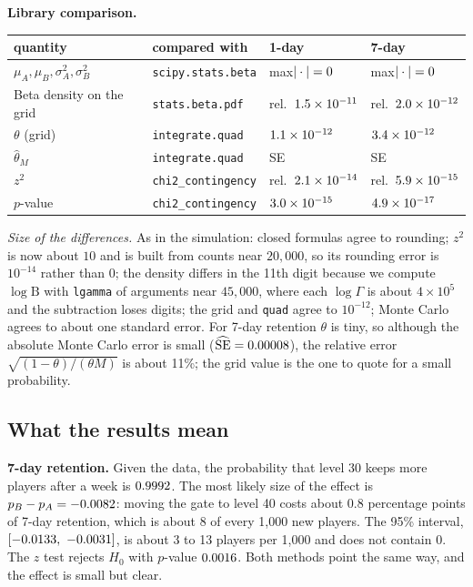 \documentclass[11pt]{article}
\theoremstyle{definition}
\theoremstyle{remark}
\newcommand{\Bfun}{\mathrm{B}}
\begin{document}
\par\noindent\begin{minipage}{\textwidth}\textbf{Library comparison.}
\begin{center}\small
\begin{tabular}{llll}\toprule
quantity & compared with & 1-day & 7-day\\ \midrule
$\mu_A,\mu_B,\sigma_A^2,\sigma_B^2$ & \texttt{scipy.stats.beta} & max$|\cdot|=0$ & max$|\cdot|=0$\\
Beta density on the grid & \texttt{stats.beta.pdf} & rel.\ $1.5\times10^{-11}$ & rel.\ $2.0\times10^{-12}$\\
$\theta$ (grid) & \texttt{integrate.quad} & $1.1\times10^{-12}$ & $3.4\times10^{-12}$\\
$\hat\theta_M$ & \texttt{integrate.quad} & \realOneNSE{} SE & \realSevenNSE{} SE\\
$z^2$ & \texttt{chi2\_contingency} & rel.\ $2.1\times10^{-14}$ & rel.\ $5.9\times10^{-15}$\\
$p$-value & \texttt{chi2\_contingency} & $3.0\times10^{-15}$ & $4.9\times10^{-17}$\\
\bottomrule\end{tabular}\normalsize
\end{center}\end{minipage}

\emph{Size of the differences.} As in the simulation: closed formulas agree to rounding; $z^2$ is now about $10$ and
is built from counts near $20{,}000$, so its rounding error is $10^{-14}$ rather than $0$; the density differs in the
11th digit because we compute $\log\Bfun$ with \texttt{lgamma} of arguments near $45{,}000$, where each
$\log\Gamma$ is about $4\times10^5$ and the subtraction loses digits; the grid and \texttt{quad} agree to $10^{-12}$;
Monte Carlo agrees to about one standard error. For 7-day retention $\theta$ is tiny, so although the absolute
Monte Carlo error is small ($\widehat{\mathrm{SE}}=0.00008$), the relative error
$\sqrt{(1-\theta)/(\theta M)}$ is about 11\%; the grid value is the one to quote for a small probability.

\subsection{What the results mean}\label{sec:meaning}

\textbf{7-day retention.} Given the data, the probability that level 30 keeps more players after a week is
$0.9992$. The most likely size of the effect is $p_B-p_A=-0.0082$: moving the gate to level 40 costs
about $0.8$ percentage points of 7-day retention, which is about 8 of every 1{,}000 new players. The 95\% interval,
$[-0.0133,\ -0.0031]$, is about 3 to 13 players per 1{,}000 and does not contain 0. The $z$ test rejects
$H_0$ with $p$-value $0.0016$. Both methods point the same way, and the effect is small but clear.
\end{document}
